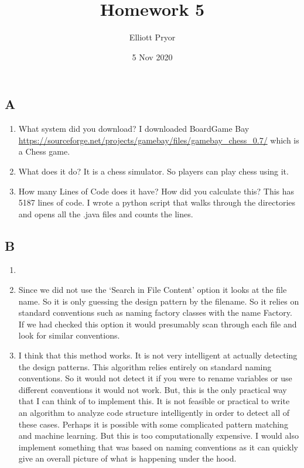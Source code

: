 \documentclass[11pt]{article}
\title{Homework 5}
\author{Elliott Pryor}
\date{5 Nov 2020}
\begin{document}
\maketitle


\subsection*{A}

\begin{enumerate}[1.]
	\item What system did you download? I downloaded BoardGame Bay 
	\url{https://sourceforge.net/projects/gamebay/files/gamebay_chess_0.7/}
	which is a Chess game. 
	
	\item What does it do? It is a chess simulator. So players can play chess using it.
	
	\item How many Lines of Code does it have? How did you calculate this? This has 5187 lines of code. I wrote a python script that walks through the directories and opens all the .java files and counts the lines. 

\end{enumerate}

\subsection*{B}

\begin{enumerate}[1.]
	\item 
	
	
	\item Since we did not use the `Search in File Content' option it looks at the file name. So it is only guessing the design pattern by the filename. So it relies on standard conventions such as naming factory classes with the name Factory. If we had checked this option it would presumably scan through each file and look for similar conventions.
	
	\item I think that this method works. 
	It is not very intelligent at actually detecting the design patterns.
	 This algorithm relies entirely on standard naming conventions. 
	 So it would not detect it if you were to rename variables or use different conventions it would not work.
	  But, this is the only practical way that I can think of to implement this. It is not feasible or practical to write an algorithm to analyze code structure intelligently in order to detect all of these cases. 
	  Perhaps it is possible with some complicated pattern matching and machine learning. But this is too computationally expensive. 
	I would also implement something that was based on naming conventions as it can quickly give an overall picture of what is happening under the hood.
\end{enumerate}
\end{document}
